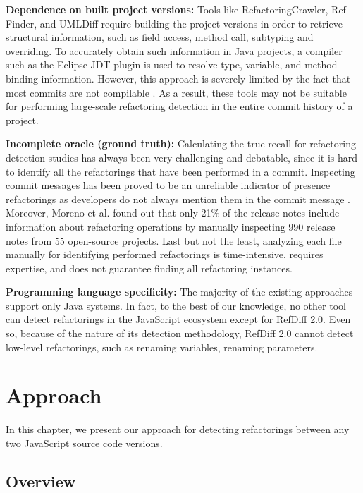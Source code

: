 \documentclass[letterpaper,12pt,onecolumn,final]{report}
\begin{document}
\textbf{Dependence on built project versions:} Tools like RefactoringCrawler, Ref-Finder, and UMLDiff require building the project versions in order to retrieve structural information, such as field access, method call, subtyping and overriding. To accurately obtain such information in Java projects, a compiler such as the Eclipse JDT plugin is used to resolve type, variable, and method binding information. However, this approach is severely limited by the fact that most commits are not compilable \cite{Tufano2017}. As a result, these tools may not be suitable for performing large-scale refactoring detection in the entire commit history of a project.

\textbf{Incomplete oracle (ground truth):} Calculating the true recall for refactoring detection studies has always been very challenging and debatable, since it is hard to identify all the refactorings that have been performed in a commit. Inspecting commit messages has been proved to be an unreliable indicator of presence refactorings as developers do not always mention them in the commit message \cite{MurphyHill2012}. Moreover, Moreno et al. \cite{laura2017arena} found out that only 21\% of the release notes include information about refactoring operations by manually inspecting 990 release notes from 55 open-source projects. Last but not the least, analyzing each file manually for identifying performed refactorings is time-intensive, requires expertise, and does not guarantee finding all refactoring instances. 

\textbf{Programming language specificity:} The majority of the existing approaches support only Java systems. In fact, to the best of our knowledge, no other tool can detect refactorings in the JavaScript ecosystem except for RefDiff 2.0. Even so, because of the nature of its detection methodology, RefDiff 2.0 cannot detect low-level refactorings, such as renaming variables, renaming parameters.

\chapter{Approach}

In this chapter, we present our approach for detecting refactorings between any two JavaScript source code versions.

\section *{Overview}
\end{document}

